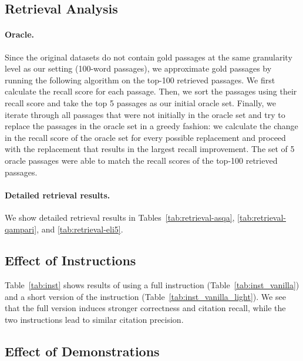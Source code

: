 \subsection{Retrieval Analysis}
\label{app_sec:retrieval}


\paragraph{Oracle.}
Since the original datasets do not contain gold passages
at the same granularity level as our setting (100-word passages), 
we approximate gold passages by running the following algorithm on the top-100 retrieved passages.
We first calculate the recall score for each passage. %
Then, we sort the passages using their recall score and take the top 5 passages as our initial oracle set.
Finally, we iterate through all passages that were not initially in the oracle set and try to replace the passages in the oracle set in a greedy fashion: we calculate the change in the recall score of the oracle set for every possible replacement and proceed with the replacement that results in the largest recall improvement. %
The set of 5 oracle passages were able to match the recall scores of the top-100 retrieved passages.


\paragraph{Detailed retrieval results.}
We show detailed retrieval results in Tables~\ref{tab:retrieval-asqa}, \ref{tab:retrieval-qampari}, and \ref{tab:retrieval-eli5}.






\subsection{Effect of Instructions}
\label{sec:inst}

Table~\ref{tab:inst} shows results of using a full instruction (Table~\ref{tab:inst_vanilla}) and a short version of the instruction (Table~\ref{tab:inst_vanilla_light}).
We see that the full version induces stronger correctness and citation recall, while the two instructions lead to similar citation precision.

\subsection{Effect of Demonstrations}

